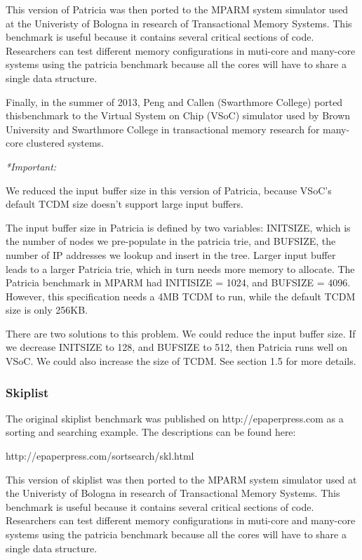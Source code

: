 \documentclass{article}
\begin{document}
This version of Patricia was then ported to the MPARM system simulator used at 
the Univeristy of Bologna in research of Transactional Memory Systems. This
benchmark is useful because it contains several critical sections of code. 
Researchers can test different memory configurations in muti-core and many-core 
systems using the patricia benchmark because all the cores will have to share a 
single data structure. 

Finally, in the summer of 2013, Peng and Callen (Swarthmore College) ported 
thisbenchmark to the Virtual System on Chip (VSoC) simulator used by Brown 
University and Swarthmore College in transactional memory research for 
many-core clustered systems. 

\vspace{2mm}
\emph{*Important:} 

We reduced the input buffer size in this version of Patricia, because VSoC's default TCDM size doesn't support large input buffers. 

The input buffer size in Patricia is defined by two variables: INITSIZE, which is the number of nodes we pre-populate in the patricia trie, and BUFSIZE, the number of IP addresses we lookup and insert in the tree. Larger input buffer leads to a larger Patricia trie, which in turn needs more memory to allocate. The Patricia benchmark in MPARM had INITISIZE = 1024, and BUFSIZE = 4096. However, this specification needs a 4MB TCDM to run, while the default TCDM size is only 256KB. 

There are two solutions to this problem. We could reduce the input buffer size. If we decrease INITSIZE to 128, and BUFSIZE to 512, then Patricia runs well on VSoC. We could also increase the size of TCDM. See section 1.5 for more details.

\subsubsection{Skiplist}

The original skiplist benchmark was published on http://epaperpress.com
as a sorting and searching example. The descriptions can be found here:

http://epaperpress.com/sortsearch/skl.html

This version of skiplist was then ported to the MPARM system simulator used at 
the Univeristy of Bologna in research of Transactional Memory Systems. This
benchmark is useful because it contains several critical sections of code. 
Researchers can test different memory configurations in muti-core and 
many-core systems using the patricia benchmark because all the cores will have 
to share a single data structure. 
\end{document}
